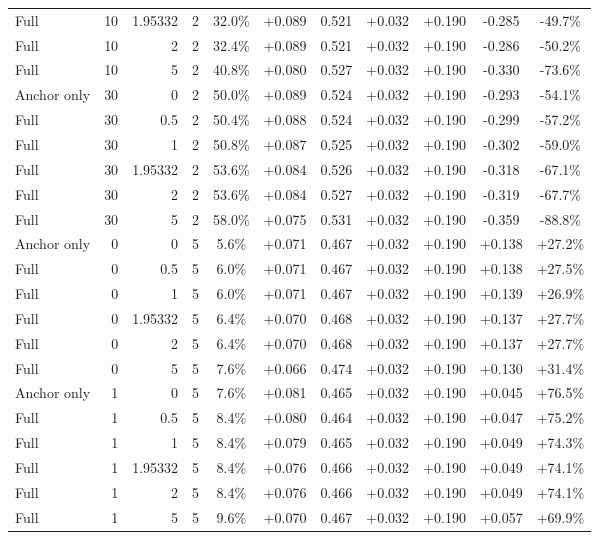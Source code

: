 \begin{table}[htbp]
\begin{tabular}{lrrrccccccc}
Full & 10 & 1.95332 & 2 & 32.0\% & +0.089 & 0.521 & +0.032 & +0.190 & -0.285 & -49.7\% \\
Full & 10 & 2 & 2 & 32.4\% & +0.089 & 0.521 & +0.032 & +0.190 & -0.286 & -50.2\% \\
Full & 10 & 5 & 2 & 40.8\% & +0.080 & 0.527 & +0.032 & +0.190 & -0.330 & -73.6\% \\
Anchor only & 30 & 0 & 2 & 50.0\% & +0.089 & 0.524 & +0.032 & +0.190 & -0.293 & -54.1\% \\
Full & 30 & 0.5 & 2 & 50.4\% & +0.088 & 0.524 & +0.032 & +0.190 & -0.299 & -57.2\% \\
Full & 30 & 1 & 2 & 50.8\% & +0.087 & 0.525 & +0.032 & +0.190 & -0.302 & -59.0\% \\
Full & 30 & 1.95332 & 2 & 53.6\% & +0.084 & 0.526 & +0.032 & +0.190 & -0.318 & -67.1\% \\
Full & 30 & 2 & 2 & 53.6\% & +0.084 & 0.527 & +0.032 & +0.190 & -0.319 & -67.7\% \\
Full & 30 & 5 & 2 & 58.0\% & +0.075 & 0.531 & +0.032 & +0.190 & -0.359 & -88.8\% \\
Anchor only & 0 & 0 & 5 & 5.6\% & +0.071 & 0.467 & +0.032 & +0.190 & +0.138 & +27.2\% \\
Full & 0 & 0.5 & 5 & 6.0\% & +0.071 & 0.467 & +0.032 & +0.190 & +0.138 & +27.5\% \\
Full & 0 & 1 & 5 & 6.0\% & +0.071 & 0.467 & +0.032 & +0.190 & +0.139 & +26.9\% \\
Full & 0 & 1.95332 & 5 & 6.4\% & +0.070 & 0.468 & +0.032 & +0.190 & +0.137 & +27.7\% \\
Full & 0 & 2 & 5 & 6.4\% & +0.070 & 0.468 & +0.032 & +0.190 & +0.137 & +27.7\% \\
Full & 0 & 5 & 5 & 7.6\% & +0.066 & 0.474 & +0.032 & +0.190 & +0.130 & +31.4\% \\
Anchor only & 1 & 0 & 5 & 7.6\% & +0.081 & 0.465 & +0.032 & +0.190 & +0.045 & +76.5\% \\
Full & 1 & 0.5 & 5 & 8.4\% & +0.080 & 0.464 & +0.032 & +0.190 & +0.047 & +75.2\% \\
Full & 1 & 1 & 5 & 8.4\% & +0.079 & 0.465 & +0.032 & +0.190 & +0.049 & +74.3\% \\
Full & 1 & 1.95332 & 5 & 8.4\% & +0.076 & 0.466 & +0.032 & +0.190 & +0.049 & +74.1\% \\
Full & 1 & 2 & 5 & 8.4\% & +0.076 & 0.466 & +0.032 & +0.190 & +0.049 & +74.1\% \\
Full & 1 & 5 & 5 & 9.6\% & +0.070 & 0.467 & +0.032 & +0.190 & +0.057 & +69.9\% \\

\end{tabular}
\end{table}
